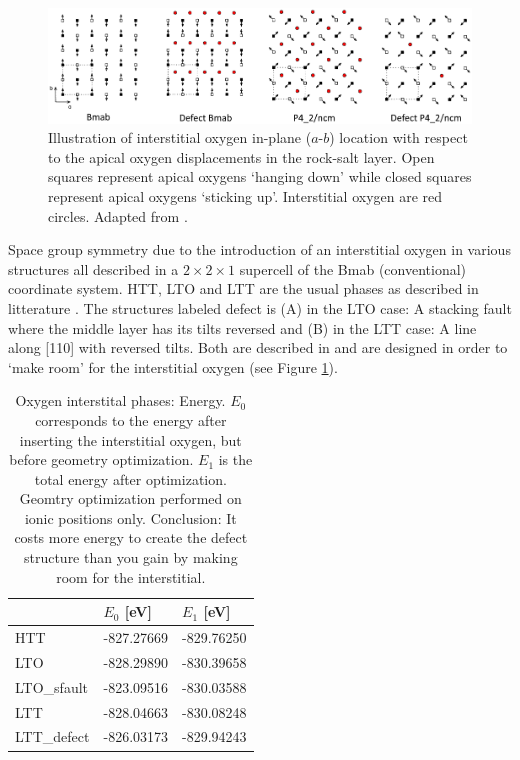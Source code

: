 \begin{figure}
    \centering
    \includegraphics[width=\textwidth]{fig/simulation/oint.png}
    \caption[Illustration of interstitial positions]{Illustration of interstitial oxygen in-plane ($a$-$b$) location with respect to the apical oxygen displacements in the rock-salt layer. Open squares represent apical oxygens `hanging down' while closed squares represent apical oxygens `sticking up'. Interstitial oxygen are red circles. Adapted from \cite{Tranquada1995}.}
    \label{fig:oint_location}
\end{figure}

\begin{table}[b]
    \centering
    
    \caption[Oxygen interstitial phases]{Space group symmetry due to the introduction of an interstitial oxygen in various structures all described in a $2 \times 2 \times 1$ supercell of the Bmab (conventional) coordinate system. HTT, LTO and LTT are the usual phases as described in litterature \cite{Hucker2012}. The structures labeled defect is (A) in the LTO case: A stacking fault where the middle layer has its tilts reversed and (B) in the LTT case: A line along [110] with reversed tilts. Both are described in \cite{Tranquada1994} and are designed in order to `make room' for the interstitial oxygen (see Figure \ref{fig:oint_location}).}
    \label{tab:oint_locations}
\end{table}

\begin{table}[b]
    \centering
    \begin{tabular}{@{}lll@{}}
    \toprule
     & $E_0$ [eV] & $E_1$ [eV]            \\ \midrule
    HTT                     & -827.27669             & -829.76250 \\
    LTO                     & -828.29890             & -830.39658 \\
    LTO\_sfault              & -823.09516             & -830.03588 \\
    LTT                     & -828.04663             & -830.08248 \\
    LTT\_defect              & -826.03173             & -829.94243 \\ \bottomrule
    \end{tabular}
    \caption[Oxygen interstital phases: Energy]{Oxygen interstital phases: Energy. $E_0$ corresponds to the energy after inserting the interstitial oxygen, but before geometry optimization. $E_1$ is the total energy after optimization. Geomtry optimization performed on ionic positions only. Conclusion: It costs more energy to create the defect structure than you gain by making room for the interstitial.}
    \label{tab:oint_en}
\end{table}

